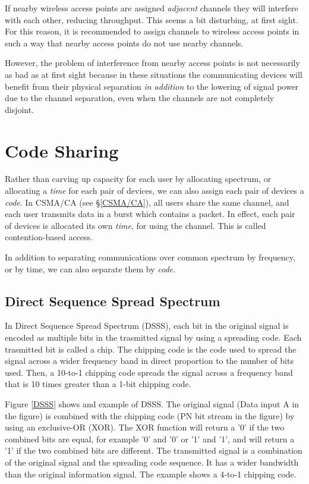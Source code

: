 If nearby wireless access points are assigned {\em adjacent} channels
they will interfere with each other, reducing throughput. This seems a bit disturbing,
at first sight. For this reason, it is recommended to assign channels to wireless
access points in such a way that nearby access points do not use nearby channels.

However, the problem of interference from nearby access points is not necessarily
as bad as at first sight because in these situations the communicating devices
will benefit from their physical separation {\em in addition} to the lowering
of signal power due to the channel separation, even when the channels are not
completely disjoint.

\section{Code Sharing}

Rather than carving up capacity for each user by allocating spectrum, or 
allocating a {\em time} for each pair of devices, 
we can also assign each pair of devices a {\em code}. In CSMA/CA (see \S\ref{CSMA/CA}),
all users share the same channel, and each user transmits data
in a burst which contains a packet. In effect, each pair of devices is
allocated its own {\em time}, for using the channel. This is called contention-based 
access. 

In addition to separating communications over common spectrum by frequency,
or by time, we can also separate them by {\em code}. 

\subsection{Direct Sequence Spread Spectrum}
	  		
In Direct Sequence Spread Spectrum 
(DSSS), each bit in the original signal is encoded as multiple
bits in the trasmitted signal by using a spreading code. Each trasmitted bit is called a chip. The chipping
code is the code used to spread the signal across a wider frequency band in direct proportion to the number
of bits used. Then, a 10-to-1 chipping code spreads the signal across a frequency band that is 10 times
greater than a 1-bit chipping code. 

Figure \ref{DSSS} shows and example of DSSS. The original signal
(Data input A in the figure) is combined with the chipping code (PN bit stream in the figure) by using
an exclusive-OR (XOR). The XOR function will return a '0' if the two combined bits are equal, for example
'0' and '0' or '1' and '1', and will return a '1' if the two combined bits are different. The transmitted signal
is a combination of the original signal and the spreading code sequence. It has a wider bandwidth
than the original information signal. The example shows a 4-to-1 chipping code.
	  		
